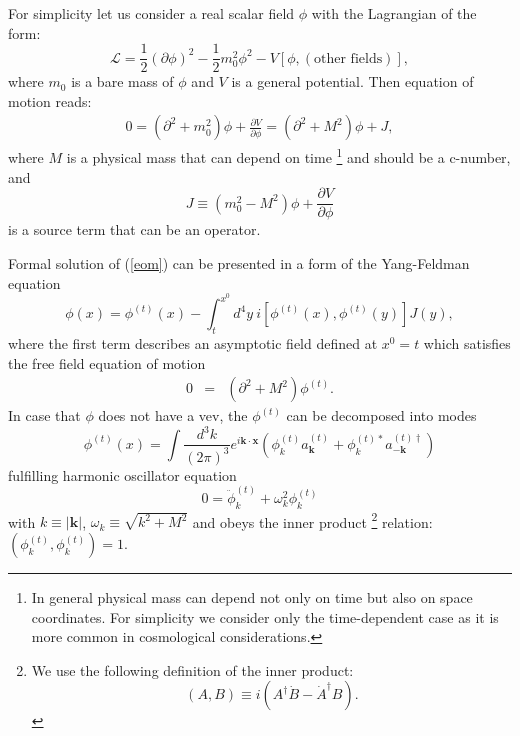 \documentclass[twocolumn,showpacs,preprintnumbers,amsmath,amssymb,nofootinbib,superscriptaddress,prc]{revtex4}
\begin{document}
For simplicity let us consider a real scalar field $\phi$ with the Lagrangian of the form:
\begin{equation}
 \mathcal{L} = \frac{1}{2} (\partial \phi)^2 - \frac{1}{2}m_0^2 \phi^2 - V[\phi,({\text{other fields}})], \label{lagr}
\end{equation}
where $m_0$ is a bare mass of $\phi$ and $V$ is a general potential. Then equation of motion reads: 
\begin{eqnarray}
 0 = (\partial^2+m_0^2)\phi+\frac{\partial V}{\partial \phi} = (\partial^2+M^2)\phi+J, \label{eom}
\end{eqnarray}
where $M$ is a physical mass that can depend on time \footnote{In general physical mass can depend not only on time but also on space coordinates. For simplicity we consider only the time-dependent case as it is more common in cosmological considerations.} and should be a c-number, and
\begin{equation}
 J \equiv (m_0^2-M^2)\phi+\frac{\partial V}{\partial \phi}
\end{equation}
is a source term that can be an operator.

Formal solution of (\ref{eom}) can be presented in a form of the Yang-Feldman equation
\begin{equation}
  \phi(x)=\phi^{(t)}(x)-\int_t^{x^0}d^4y \: i[\phi^{(t)}(x), \phi^{(t)}(y)]J(y), \label{eq:YF_real_scalar}
\end{equation}
where the first term describes an asymptotic field defined at $x^0=t$ which satisfies the free field equation of motion
\begin{eqnarray}
 0 &=& (\partial^2+M^2)\phi^{(t)}.
\end{eqnarray}
In case that $\phi$ does not have a vev,  the $\phi^{(t)}$ can be decomposed into modes
\begin{equation}
 \phi^{(t)}(x) = \int\frac{d^3k}{(2\pi)^3}e^{i\mathbf{k\cdot x}}\left(
  \phi_k^{(t)}a_{\mathbf{k}}^{(t)} + \phi_k^{(t) *}a_{\mathbf{-k}}^{{(t)}\dagger} \right)
 \label{eq:asym_real_scalar}
\end{equation}
fulfilling harmonic oscillator equation
\begin{equation}
 0 = \ddot{\phi}_k^{(t)} + \omega_k^2 \phi_k^{(t)}
\end{equation}
with $k\equiv |\mathbf{k}|$, $\omega_k\equiv\sqrt{k^2+M^2}$ and obeys the inner product \footnote{We use the following definition of the inner product: 
\begin{equation}
(A,B)\equiv i(A^\dagger \dot{B}-\dot{A}^\dagger B). \nonumber 
\end{equation}} relation: $\left(\phi_k^{(t)},\phi_k^{(t)}\right)=1$.
\end{document}
